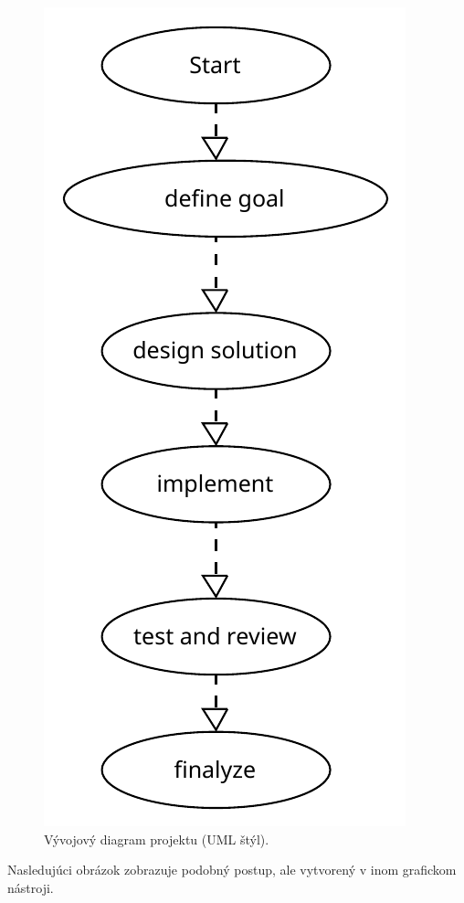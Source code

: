 \documentclass[10pt,twocolumn,twoside,slovak,a4paper]{article}
\begin{document}
\begin{figure}[h!]
    \centering
    \includegraphics[scale=0.5]{umlflowchart.pdf}
    \caption{Vývojový diagram projektu (UML štýl).}
    \label{fig:uml}
\end{figure}

Nasledujúci obrázok zobrazuje podobný postup, ale vytvorený v inom grafickom nástroji.
\end{document}
